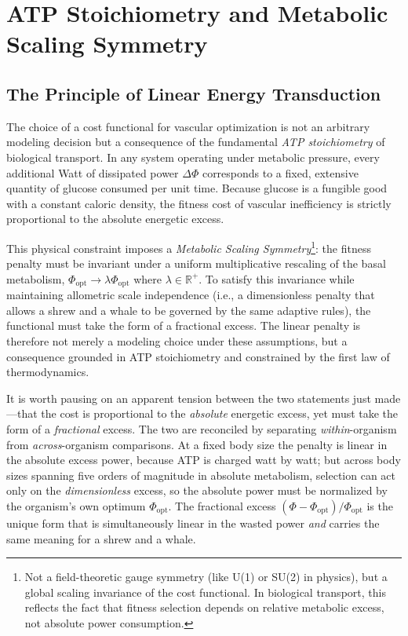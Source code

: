 \section{ATP Stoichiometry and Metabolic Scaling Symmetry}
\label{sec:gauge}

\subsection{The Principle of Linear Energy Transduction}

The choice of a cost functional for vascular optimization is not an arbitrary
modeling decision but a consequence of the fundamental \emph{ATP stoichiometry}
of biological transport. In any system operating under metabolic pressure, every
additional Watt of dissipated power $\Delta \Phi$ corresponds to a fixed,
extensive quantity of glucose consumed per unit time. Because glucose is a
fungible good with a constant caloric density, the fitness cost of vascular
inefficiency is strictly proportional to the absolute energetic excess.

This physical constraint imposes a \emph{Metabolic Scaling
Symmetry}\footnote{Not a field-theoretic gauge symmetry (like U(1) or SU(2) in
physics), but a global scaling invariance of the cost functional. In biological
transport, this reflects the fact that fitness selection depends on relative
metabolic excess, not absolute power consumption.}: the fitness penalty must be
invariant under a uniform multiplicative rescaling of the basal metabolism,
$\Phi_{\mathrm{opt}} \to \lambda\Phi_{\mathrm{opt}}$ where $\lambda \in
\mathbb{R}^+$. To satisfy this invariance while maintaining allometric scale
independence (i.e., a dimensionless penalty that allows a shrew and a whale to
be governed by the same adaptive rules), the functional must take the form of a
fractional excess. The linear penalty is therefore not merely a modeling
choice under these assumptions, but a consequence grounded in ATP stoichiometry
and constrained by the first law of thermodynamics.

It is worth pausing on an apparent tension between the two statements just
made---that the cost is proportional to the \emph{absolute} energetic excess,
yet must take the form of a \emph{fractional} excess. The two are reconciled by
separating \emph{within}-organism from \emph{across}-organism comparisons. At a
fixed body size the penalty is linear in the absolute excess power, because ATP
is charged watt by watt; but across body sizes spanning five orders of magnitude
in absolute metabolism, selection can act only on the \emph{dimensionless}
excess, so the absolute power must be normalized by the organism's own optimum
$\Phi_{\mathrm{opt}}$. The fractional excess
$(\Phi-\Phi_{\mathrm{opt}})/\Phi_{\mathrm{opt}}$ is the unique form that is
simultaneously linear in the wasted power \emph{and} carries the same meaning
for a shrew and a whale.

